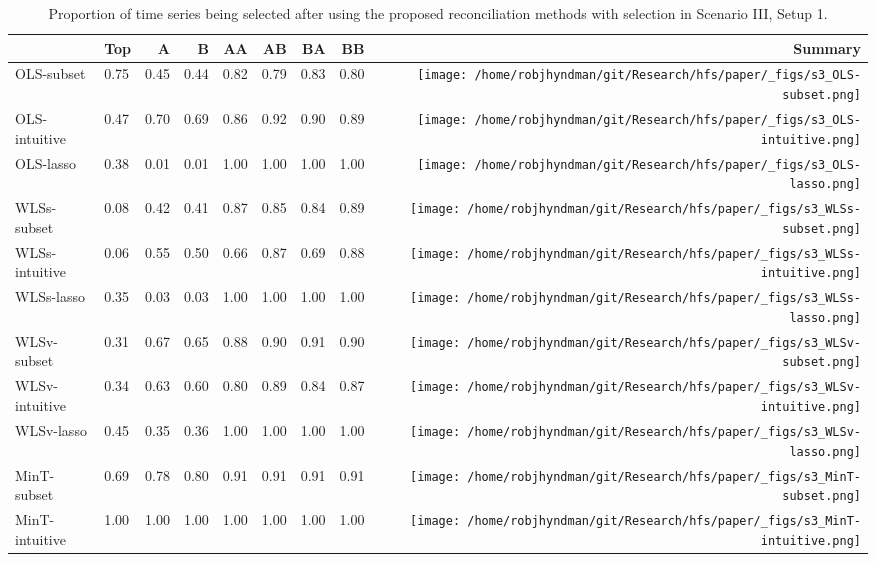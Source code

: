 \documentclass[
  12pt,
  11pt]{article}
\begin{document}
\hypertarget{tbl-s3-selection}{}
\begin{table}[!h]
\caption{\label{tbl-s3-selection}Proportion of time series being selected after using the proposed
reconciliation methods with selection in Scenario III, Setup 1. }\tabularnewline

\centering\begingroup\fontsize{11}{13}\selectfont

\begin{threeparttable}
\begin{tabular}{llrrrrrr>{}r}
\toprule
  & Top & A & B & AA & AB & BA & BB & Summary\\
\midrule
OLS-subset & 0.75 & 0.45 & 0.44 & 0.82 & 0.79 & 0.83 & 0.80 & \texttt{[image: /home/robjhyndman/git/Research/hfs/paper/\_figs/s3\_OLS-subset.png]}\\
OLS-intuitive & 0.47 & 0.70 & 0.69 & 0.86 & 0.92 & 0.90 & 0.89 & \texttt{[image: /home/robjhyndman/git/Research/hfs/paper/\_figs/s3\_OLS-intuitive.png]}\\
OLS-lasso & 0.38 & 0.01 & 0.01 & 1.00 & 1.00 & 1.00 & 1.00 & \texttt{[image: /home/robjhyndman/git/Research/hfs/paper/\_figs/s3\_OLS-lasso.png]}\\
\midrule
WLSs-subset & 0.08 & 0.42 & 0.41 & 0.87 & 0.85 & 0.84 & 0.89 & \texttt{[image: /home/robjhyndman/git/Research/hfs/paper/\_figs/s3\_WLSs-subset.png]}\\
WLSs-intuitive & 0.06 & 0.55 & 0.50 & 0.66 & 0.87 & 0.69 & 0.88 & \texttt{[image: /home/robjhyndman/git/Research/hfs/paper/\_figs/s3\_WLSs-intuitive.png]}\\
WLSs-lasso & 0.35 & 0.03 & 0.03 & 1.00 & 1.00 & 1.00 & 1.00 & \texttt{[image: /home/robjhyndman/git/Research/hfs/paper/\_figs/s3\_WLSs-lasso.png]}\\
\midrule
WLSv-subset & 0.31 & 0.67 & 0.65 & 0.88 & 0.90 & 0.91 & 0.90 & \texttt{[image: /home/robjhyndman/git/Research/hfs/paper/\_figs/s3\_WLSv-subset.png]}\\
WLSv-intuitive & 0.34 & 0.63 & 0.60 & 0.80 & 0.89 & 0.84 & 0.87 & \texttt{[image: /home/robjhyndman/git/Research/hfs/paper/\_figs/s3\_WLSv-intuitive.png]}\\
WLSv-lasso & 0.45 & 0.35 & 0.36 & 1.00 & 1.00 & 1.00 & 1.00 & \texttt{[image: /home/robjhyndman/git/Research/hfs/paper/\_figs/s3\_WLSv-lasso.png]}\\
\midrule
MinT-subset & 0.69 & 0.78 & 0.80 & 0.91 & 0.91 & 0.91 & 0.91 & \texttt{[image: /home/robjhyndman/git/Research/hfs/paper/\_figs/s3\_MinT-subset.png]}\\
MinT-intuitive & 1.00 & 1.00 & 1.00 & 1.00 & 1.00 & 1.00 & 1.00 & \texttt{[image: /home/robjhyndman/git/Research/hfs/paper/\_figs/s3\_MinT-intuitive.png]}\\

\end{tabular}
\end{threeparttable}
\end{table}
\end{document}
